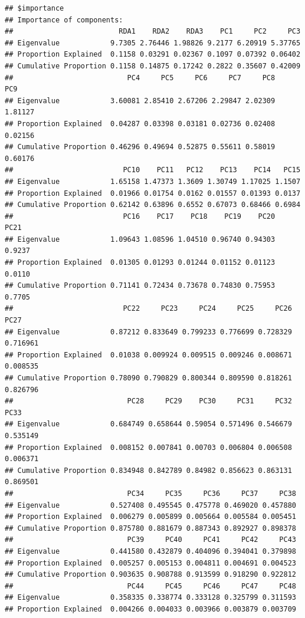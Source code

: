 \documentclass[]{article}
\begin{document}
\begin{verbatim}
## $importance
## Importance of components:
##                         RDA1    RDA2    RDA3    PC1     PC2     PC3
## Eigenvalue            9.7305 2.76446 1.98826 9.2177 6.20919 5.37765
## Proportion Explained  0.1158 0.03291 0.02367 0.1097 0.07392 0.06402
## Cumulative Proportion 0.1158 0.14875 0.17242 0.2822 0.35607 0.42009
##                           PC4     PC5     PC6     PC7     PC8     PC9
## Eigenvalue            3.60081 2.85410 2.67206 2.29847 2.02309 1.81127
## Proportion Explained  0.04287 0.03398 0.03181 0.02736 0.02408 0.02156
## Cumulative Proportion 0.46296 0.49694 0.52875 0.55611 0.58019 0.60176
##                          PC10    PC11   PC12    PC13    PC14   PC15
## Eigenvalue            1.65158 1.47373 1.3609 1.30749 1.17025 1.1507
## Proportion Explained  0.01966 0.01754 0.0162 0.01557 0.01393 0.0137
## Cumulative Proportion 0.62142 0.63896 0.6552 0.67073 0.68466 0.6984
##                          PC16    PC17    PC18    PC19    PC20   PC21
## Eigenvalue            1.09643 1.08596 1.04510 0.96740 0.94303 0.9237
## Proportion Explained  0.01305 0.01293 0.01244 0.01152 0.01123 0.0110
## Cumulative Proportion 0.71141 0.72434 0.73678 0.74830 0.75953 0.7705
##                          PC22     PC23     PC24     PC25     PC26     PC27
## Eigenvalue            0.87212 0.833649 0.799233 0.776699 0.728329 0.716961
## Proportion Explained  0.01038 0.009924 0.009515 0.009246 0.008671 0.008535
## Cumulative Proportion 0.78090 0.790829 0.800344 0.809590 0.818261 0.826796
##                           PC28     PC29    PC30     PC31     PC32     PC33
## Eigenvalue            0.684749 0.658644 0.59054 0.571496 0.546679 0.535149
## Proportion Explained  0.008152 0.007841 0.00703 0.006804 0.006508 0.006371
## Cumulative Proportion 0.834948 0.842789 0.84982 0.856623 0.863131 0.869501
##                           PC34     PC35     PC36     PC37     PC38
## Eigenvalue            0.527408 0.495545 0.475778 0.469020 0.457880
## Proportion Explained  0.006279 0.005899 0.005664 0.005584 0.005451
## Cumulative Proportion 0.875780 0.881679 0.887343 0.892927 0.898378
##                           PC39     PC40     PC41     PC42     PC43
## Eigenvalue            0.441580 0.432879 0.404096 0.394041 0.379898
## Proportion Explained  0.005257 0.005153 0.004811 0.004691 0.004523
## Cumulative Proportion 0.903635 0.908788 0.913599 0.918290 0.922812
##                           PC44     PC45     PC46     PC47     PC48
## Eigenvalue            0.358335 0.338774 0.333128 0.325799 0.311593
## Proportion Explained  0.004266 0.004033 0.003966 0.003879 0.003709

\end{verbatim}
\end{document}

